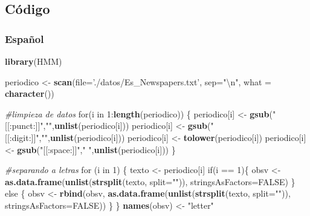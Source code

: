 \documentclass[]{article}
\newenvironment{Shaded}{\begin{snugshade}}{\end{snugshade}}
\newcommand{\KeywordTok}[1]{\textcolor[rgb]{0.13,0.29,0.53}{\textbf{{#1}}}}
\newcommand{\DataTypeTok}[1]{\textcolor[rgb]{0.13,0.29,0.53}{{#1}}}
\newcommand{\DecValTok}[1]{\textcolor[rgb]{0.00,0.00,0.81}{{#1}}}
\newcommand{\CharTok}[1]{\textcolor[rgb]{0.31,0.60,0.02}{{#1}}}
\newcommand{\StringTok}[1]{\textcolor[rgb]{0.31,0.60,0.02}{{#1}}}
\newcommand{\CommentTok}[1]{\textcolor[rgb]{0.56,0.35,0.01}{\textit{{#1}}}}
\newcommand{\OtherTok}[1]{\textcolor[rgb]{0.56,0.35,0.01}{{#1}}}
\newcommand{\NormalTok}[1]{{#1}}
\begin{document}
\pagebreak

\subsection{Código}\label{codigo}

\subsubsection{Español}\label{espanol}

\begin{Shaded}
\begin{Highlighting}[]
\KeywordTok{library}\NormalTok{(HMM)}

\NormalTok{periodico <-}\StringTok{ }\KeywordTok{scan}\NormalTok{(}\DataTypeTok{file=}\StringTok{'./datos/Es_Newspapers.txt'}\NormalTok{, }\DataTypeTok{sep=}\StringTok{"}\CharTok{\textbackslash{}n}\StringTok{"}\NormalTok{, }
                  \DataTypeTok{what =} \KeywordTok{character}\NormalTok{())}

\CommentTok{#limpieza de datos}
\NormalTok{for(i in }\DecValTok{1}\NormalTok{:}\KeywordTok{length}\NormalTok{(periodico)) \{}
  \NormalTok{periodico[i] <-}\StringTok{ }\KeywordTok{gsub}\NormalTok{(}\StringTok{"[[:punct:]]"}\NormalTok{,}\StringTok{""}\NormalTok{,}\KeywordTok{unlist}\NormalTok{(periodico[i]))}
  \NormalTok{periodico[i] <-}\StringTok{ }\KeywordTok{gsub}\NormalTok{(}\StringTok{"[[:digit:]]"}\NormalTok{,}\StringTok{""}\NormalTok{,}\KeywordTok{unlist}\NormalTok{(periodico[i]))}
  \NormalTok{periodico[i] <-}\StringTok{ }\KeywordTok{tolower}\NormalTok{(periodico[i])}
  \NormalTok{periodico[i] <-}\StringTok{ }\KeywordTok{gsub}\NormalTok{(}\StringTok{"[[:space:]]"}\NormalTok{,}\StringTok{" "}\NormalTok{,}\KeywordTok{unlist}\NormalTok{(periodico[i]))}
\NormalTok{\}}


\CommentTok{#separando a letras}
\NormalTok{for (i in }\DecValTok{1}\NormalTok{) \{}
  \NormalTok{texto <-}\StringTok{ }\NormalTok{periodico[i]}
  \NormalTok{if(i ==}\StringTok{ }\DecValTok{1}\NormalTok{)\{}
    \NormalTok{obsv <-}\StringTok{ }\KeywordTok{as.data.frame}\NormalTok{(}\KeywordTok{unlist}\NormalTok{(}\KeywordTok{strsplit}\NormalTok{(texto, }\DataTypeTok{split=}\StringTok{""}\NormalTok{)), }
                          \DataTypeTok{stringsAsFactors=}\OtherTok{FALSE}\NormalTok{)}
  \NormalTok{\} else \{}
    \NormalTok{obsv <-}\StringTok{ }\KeywordTok{rbind}\NormalTok{(obsv, }\KeywordTok{as.data.frame}\NormalTok{(}\KeywordTok{unlist}\NormalTok{(}\KeywordTok{strsplit}\NormalTok{(texto, }\DataTypeTok{split=}\StringTok{""}\NormalTok{)), }
                                      \DataTypeTok{stringsAsFactors=}\OtherTok{FALSE}\NormalTok{))}
  \NormalTok{\}}
\NormalTok{\}}
\KeywordTok{names}\NormalTok{(obsv) <-}\StringTok{ "letter"}



\end{Highlighting}
\end{Shaded}
\end{document}
